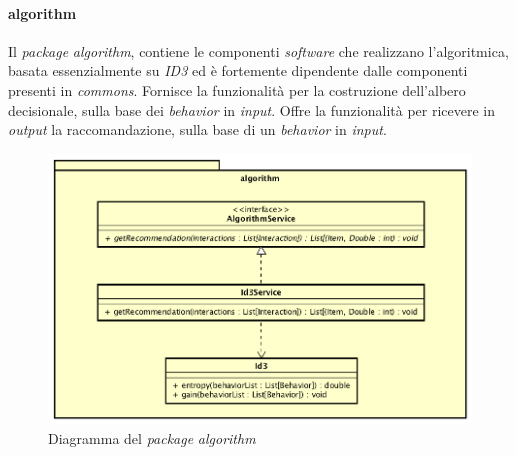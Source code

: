 \paragraph*{algorithm}
Il \emph{package} \emph{algorithm}, contiene le componenti \emph{software} che realizzano l'algoritmica, basata essenzialmente su \emph{ID3} ed è fortemente dipendente dalle componenti presenti in \emph{commons}. Fornisce la funzionalità per la costruzione dell'albero decisionale, sulla base dei \emph{behavior} in \emph{input}. Offre la funzionalità per ricevere in \emph{output} la raccomandazione, sulla base di un \emph{behavior} in \emph{input}.
\begin{figure}[h]
\centering
\includegraphics[scale=0.30]{immagini/algorithm}
\caption{Diagramma del \emph{package} \emph{algorithm}}
\label{fig:pack-algorithm}
\end{figure}
